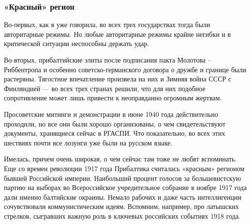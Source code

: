  
 
 
 
 

\clearpage
\subsubsection{«Красный» регион}
\label{sec:02_12_2020.news.ru.lenta_ru.mozzhuhin_andrei.1.pribaltika.krasnyy_region}


Во-первых, как я уже говорила, во всех трех государствах тогда были
авторитарные режимы. Но любые авторитарные режимы крайне негибки и в
критической ситуации неспособны держать удар.

Во-вторых, прибалтийские элиты после подписания пакта Молотова – Риббентропа и
особенно советско-германского договора о дружбе и границе были растеряны.
Тягостное впечатление произвела на них и Зимняя война СССР с Финляндией — во
всех трех странах решили, что для них подобное сопротивление может лишь
привести к неоправданно огромным жертвам.


Просоветские митинги и демонстрации в июне 1940 года действительно проходили,
но все они были хорошо организованы, о чем свидетельствуют документы,
хранящиеся сейчас в РГАСПИ. Что показательно, во всех этих шествиях почти все
лозунги уже были на русском языке.


Имелась, причем очень широкая, о чем сейчас там тоже не любят вспоминать. Еще
со времен революции 1917 года Прибалтика считалась «красным» регионом бывшей
Российской империи. Наибольший процент голосов за большевистскую партию на
выборах во Всероссийское учредительное собрание в ноябре 1917 года дали именно
балтийские окраины. Немало рабочих и даже часть интеллигенции сочувствовали
коммунистическим идеям. Вспомним, например, про латышских стрелков, сыгравших
важную роль в ключевых российских событиях 1918 года.

